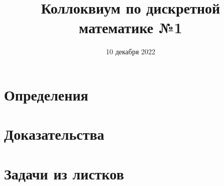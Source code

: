 \documentclass[a4paper]{article}
\title{Коллоквиум по дискретной математике №1}
\author{ %
}
\date{10 декабря 2022}
\begin{document}
	\maketitle
	
	\tableofcontents
	\newpage
	\section{Определения} {
		 
		 
		 
		 
		 
		 
	}
	\newpage
	\section{Доказательства} {
		
		
		
		
		
		
		
		
		
		
		
		
	}
	\newpage
	\section{Задачи из листков}{
	}
\end{document}
